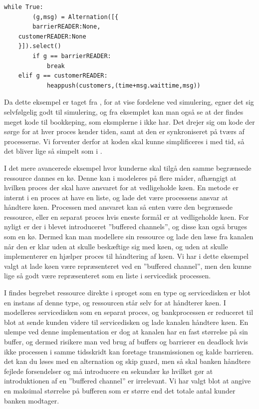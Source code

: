 \begin{lstlisting}[float=hbtp,label=bank-alternation-imp,caption=Modtage en kunde eller 
	barrier i Bankprocessen]
while True:
		(g,msg) = Alternation([{
		barrierREADER:None,
    customerREADER:None
    }]).select()
		if g == barrierREADER:
			break
    elif g == customerREADER:
			heappush(customers,(time+msg.waittime,msg))
\end{lstlisting}


Da dette eksempel er taget fra \simpy, for at vise fordelene ved simulering, egner det sig selvfølgelig godt til simulering, og fra eksemplet kan man også se at der findes meget kode til bookkeping, som eksmplerne i \simpy ikke har. Det drejer sig om kode der sørge for at hver proces kender tiden, samt at den er synkroniseret på tværs af processerne. Vi forventer derfor at koden skal kunne simplificeres i \pycsp med tid, så det bliver lige så simpelt som i \simpy.

I det mere avancerede eksempel hvor kunderne skal tilgå den samme begrænsede ressource dannes en kø. Denne kan i \pycsp modeleres på flere måder, afhængigt at hvilken proces der skal have ansvaret for at vedligeholde køen. En metode er internt i en proces at have en liste, og lade det være processens ansvar at håndtere køen. Processen med ansvaret kan så enten være den begrænsede ressource, eller en separat proces hvis eneste formål er at vedligeholde køen. For nyligt er der i \pycsp blevet introduceret ''buffered channels'', og disse kan også bruges som en kø. Dermed kan man modellere sin ressource og lade den læse fra kanalen når den er klar uden at skulle beskæftige sig med køen, og uden at skulle implementerer en hjælper proces til håndtering af køen. Vi har i dette eksempel valgt at lade køen være repræsenteret ved en ''buffered channel'', men den kunne lige så godt være repræsenteret som en liste i servicedisk processen.

I \simpy findes begrebet ressource direkte i sproget som en type og servicedisken er blot en instans af denne type, og ressourcen står selv for at håndterer køen. I \pycsp modelleres servicedisken som en separat proces, og bankprocessen er reduceret til blot at sende kunden videre til servicedisken og lade kanalen håndtere køen. En ulempe ved denne implementation er dog at kanalen har en fast størrelse på sin buffer, og dermed risikere man ved brug af buffers og barrierer en deadlock hvis ikke processen i samme tidsskridt kan foretage transmissionen og kalde barrieren. det kan du løses med en alternation og skip guard, men så skal banken håndtere fejlede forsendelser og må introducere en sekundær kø hvilket gør at introduktionen af en ''buffered channel'' er irrelevant. Vi har valgt blot at angive en maksimal størrelse på bufferen som er større end det totale antal kunder banken modtager.

